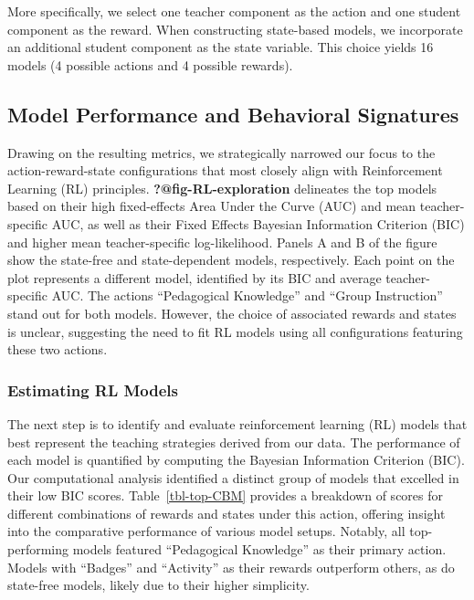 \documentclass[
  number,
  preprint,
  3p,
  onecolumn]{elsarticle}
\begin{document}
More specifically, we select one teacher component as the action and one
student component as the reward. When constructing state-based models,
we incorporate an additional student component as the state variable.
This choice yields 16 models (4 possible actions and 4 possible
rewards).

\subsection{Model Performance and Behavioral
Signatures}\label{model-performance-and-behavioral-signatures}

Drawing on the resulting metrics, we strategically narrowed our focus to
the action-reward-state configurations that most closely align with
Reinforcement Learning (RL) principles. \textbf{?@fig-RL-exploration}
delineates the top models based on their high fixed-effects Area Under
the Curve (AUC) and mean teacher-specific AUC, as well as their Fixed
Effects Bayesian Information Criterion (BIC) and higher mean
teacher-specific log-likelihood. Panels A and B of the figure show the
state-free and state-dependent models, respectively. Each point on the
plot represents a different model, identified by its BIC and average
teacher-specific AUC. The actions ``Pedagogical Knowledge'' and ``Group
Instruction'' stand out for both models. However, the choice of
associated rewards and states is unclear, suggesting the need to fit RL
models using all configurations featuring these two actions.

\subsubsection{Estimating RL Models}\label{estimating-rl-models}

The next step is to identify and evaluate reinforcement learning (RL)
models that best represent the teaching strategies derived from our
data. The performance of each model is quantified by computing the
Bayesian Information Criterion (BIC). Our computational analysis
identified a distinct group of models that excelled in their low BIC
scores. Table~\ref{tbl-top-CBM} provides a breakdown of scores for
different combinations of rewards and states under this action, offering
insight into the comparative performance of various model setups.
Notably, all top-performing models featured ``Pedagogical Knowledge'' as
their primary action. Models with ``Badges'' and ``Activity'' as their
rewards outperform others, as do state-free models, likely due to their
higher simplicity.
\end{document}
